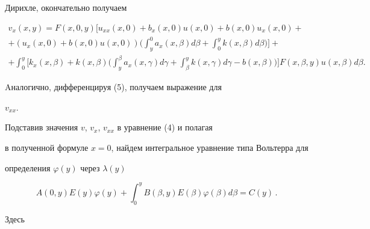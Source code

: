 Дирихле, окончательно получаем


\begin{multline}


v_{x}(x,y)=F(x,0,y)\bigg[ u_{xx}(x,0)+b_{x}(x,0)u(x,0)+


b(x,0)u_{x}(x,0)+\\


%


+(u_{x}(x,0)+b(x,0)u(x,0))\bigg(\int_{y}^{0}


a_{x}(x,\beta)d\beta+\int_{0}^{y} k(x,\beta)d\beta\bigg)\bigg]+\\


%


+\int_{0}^{y} \bigg[ k_{x}(x,\beta)+


k(x,\beta)\bigg(\int_{y}^{\beta} a_{x}(x,\gamma)d\gamma+


\int_{\beta}^{y} k(x,\gamma)d\gamma-b(x,\beta) \bigg)\bigg]


F(x,\beta,y)u(x,\beta)d\beta.


\end{multline}


Aналогично, дифференцируя (5), получаем выражение для


$v_{xx}$.





Подставив значения $v$, $v_{x}$, $v_{xx}$ в уравнение (4) и полагая


в полученной формуле $x=0$, найдем интегральное уравнение типа Вольтерра для


определения $\varphi(y)$ через $\lambda(y)$


\begin{equation}


A(0,y)E(y)\varphi(y)+\int_{0}^{y} B(\beta,y)E(\beta)\varphi(\beta)


d\beta=C(y)\, .


\end{equation}


Здесь


